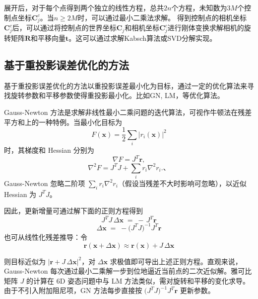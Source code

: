 展开后，对于每个点得到两个独立的线性方程，总共$2n$个方程，未知数为$3M$个控制点坐标$\mathbf{C}_j^{c}$。当$n \geq 2M$时，可以通过最小二乘法求解。
得到控制点的相机坐标$\mathbf{C}_j^{c}$后，可以通过将控制点的世界坐标$\mathbf{C}_j$和相机坐标$\mathbf{C}_j^{c}$进行刚体变换求解相机的旋转矩阵$\mathbf{R}$和平移向量$\mathbf{t}$。这可以通过求解Kabsch算法或SVD分解实现。

\subsection{基于重投影误差优化的方法}
基于重投影误差优化的方法以重投影误差最小化为目标，通过一定的优化算法来寻找旋转参数和平移参数使得重投影最小化。比如GN\cite{vcolakovic2022hand, zhu2024lodloc}, LM\cite{xu2022rnnpose}，等优化算法。

Gauss-Newton 方法是求解非线性最小二乘问题的迭代算法，可视作牛顿法在残差平方和上的一种特例。当最小化目标为 
\begin{equation}
F(\mathbf{x})=\frac{1}{2}\sum_i \bigl\lvert r_i(\mathbf{x})\bigr\rvert^2
\end{equation}
时，其梯度和 Hessian 分别为 
\begin{equation}
\nabla F = J^T \mathbf{r}, 
\end{equation}
\begin{equation}
\nabla^2 F = J^T J + \sum_i r_i \nabla^2 r_i.、
\end{equation}
Gauss-Newton 忽略二阶项 \(\sum_i r_i \nabla^2 r_i\)（假设当残差不大时影响可忽略），以近似 Hessian 为 \(J^T J\)。

因此，更新增量可通过解下面的正则方程得到
\begin{equation}
	J^T J \,\Delta \mathbf{x} \;=\; -\,J^T \mathbf{r}
\end{equation}
\begin{equation}
	\Delta \mathbf{x} \;=\; -\bigl(J^T J\bigr)^{-1} J^T \mathbf{r}
\end{equation}
也可从线性化残差推导：令 
\begin{equation}
	\mathbf{r}(\mathbf{x} + \Delta \mathbf{x}) \approx \mathbf{r}(\mathbf{x}) + J\,\Delta \mathbf{x}
\end{equation}

则目标近似为 \(\bigl\lvert \mathbf{r} + J\,\Delta \mathbf{x}\bigr\rvert^2\)，对 \(\Delta \mathbf{x}\) 求极值即可导出上述正则方程。直观来说，Gauss-Newton 每次通过最小二乘解一步到位地逼近当前点的二次近似解。雅可比矩阵 \(J\) 的计算在 6D 姿态问题中与 LM 方法类似，需对旋转和平移的变化求导。由于不引入附加阻尼项，GN 方法每步直接按 \(\bigl(J^T J\bigr)^{-1} J^T \mathbf{r}\) 更新参数。


